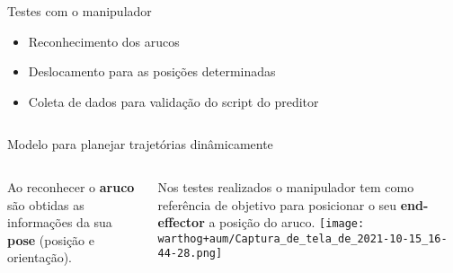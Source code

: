\begin{frame}[t]{Testes com o manipulador} 

    \begin{itemize}
        \item Reconhecimento dos arucos
        \item Deslocamento para as posições determinadas
        \item Coleta de dados para validação do script do preditor
    \end{itemize}
    \vspace*{0.6cm}
    \begin{columns}[c]

        \centering



        \centering

    \end{columns}

\end{frame}
\begin{frame}[t]{Modelo para planejar trajetórias dinâmicamente} 
    \vspace*{0.5cm} 
    \begin{columns}[c]
        Ao reconhecer o \textbf{aruco} são obtidas as informações da sua \textbf{pose} (posição e orientação).

        \vspace*{0.3cm} 
        
        Nos testes realizados o manipulador tem como referência de objetivo para posicionar o seu \textbf{end-effector} a posição do aruco.
        \texttt{[image: warthog+aum/Captura\_de\_tela\_de\_2021-10-15\_16-44-28.png]}
    \end{columns}

\end{frame}
